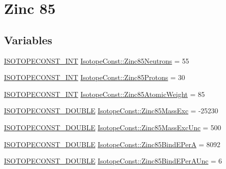 \hypertarget{group___isotope_const-_zinc-_zn85}{}\section{Zinc 85}
\label{group___isotope_const-_zinc-_zn85}
\subsection*{Variables}
\begin{DoxyCompactItemize}
\item 
\mbox{\hyperlink{group___isotope_const-_macros_ga5f18360b3e99483a35c32d789e62621c}{I\+S\+O\+T\+O\+P\+E\+C\+O\+N\+S\+T\+\_\+\+I\+NT}} \mbox{\hyperlink{group___isotope_const-_zinc-_zn85_ga466e8ff622716ba4d68dd2d5fae9ed40}{Isotope\+Const\+::\+Zinc85\+Neutrons}} = 55
\item 
\mbox{\hyperlink{group___isotope_const-_macros_ga5f18360b3e99483a35c32d789e62621c}{I\+S\+O\+T\+O\+P\+E\+C\+O\+N\+S\+T\+\_\+\+I\+NT}} \mbox{\hyperlink{group___isotope_const-_zinc-_zn85_ga83e99de99bedd4247d69a89f920544bf}{Isotope\+Const\+::\+Zinc85\+Protons}} = 30
\item 
\mbox{\hyperlink{group___isotope_const-_macros_ga5f18360b3e99483a35c32d789e62621c}{I\+S\+O\+T\+O\+P\+E\+C\+O\+N\+S\+T\+\_\+\+I\+NT}} \mbox{\hyperlink{group___isotope_const-_zinc-_zn85_ga3aba6d4b3d531b1944f62ad671cc2f9c}{Isotope\+Const\+::\+Zinc85\+Atomic\+Weight}} = 85
\item 
\mbox{\hyperlink{group___isotope_const-_macros_ga8f45a7272ce02c0b4c65c44636ed719a}{I\+S\+O\+T\+O\+P\+E\+C\+O\+N\+S\+T\+\_\+\+D\+O\+U\+B\+LE}} \mbox{\hyperlink{group___isotope_const-_zinc-_zn85_gab78cc514f0c39f32581854f3427dee20}{Isotope\+Const\+::\+Zinc85\+Mass\+Exc}} = -\/25230
\item 
\mbox{\hyperlink{group___isotope_const-_macros_ga8f45a7272ce02c0b4c65c44636ed719a}{I\+S\+O\+T\+O\+P\+E\+C\+O\+N\+S\+T\+\_\+\+D\+O\+U\+B\+LE}} \mbox{\hyperlink{group___isotope_const-_zinc-_zn85_gaecd89d469ffb3865ca6d85c210e4bb84}{Isotope\+Const\+::\+Zinc85\+Mass\+Exc\+Unc}} = 500
\item 
\mbox{\hyperlink{group___isotope_const-_macros_ga8f45a7272ce02c0b4c65c44636ed719a}{I\+S\+O\+T\+O\+P\+E\+C\+O\+N\+S\+T\+\_\+\+D\+O\+U\+B\+LE}} \mbox{\hyperlink{group___isotope_const-_zinc-_zn85_ga784848a5c8efcb87fb4be2b891f0222a}{Isotope\+Const\+::\+Zinc85\+Bind\+E\+PerA}} = 8092
\item 
\mbox{\hyperlink{group___isotope_const-_macros_ga8f45a7272ce02c0b4c65c44636ed719a}{I\+S\+O\+T\+O\+P\+E\+C\+O\+N\+S\+T\+\_\+\+D\+O\+U\+B\+LE}} \mbox{\hyperlink{group___isotope_const-_zinc-_zn85_gae9293f259db541e37ffb45e800090fee}{Isotope\+Const\+::\+Zinc85\+Bind\+E\+Per\+A\+Unc}} = 6

\end{DoxyCompactItemize}
